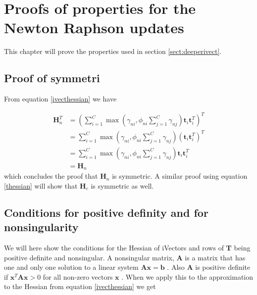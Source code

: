 \chapter{Proofs of properties for the Newton Raphson updates}

This chapter will prove the properties used in section \ref{sect:deeperivect}. 


\section{Proof of symmetri}
\label{symproof}

From equation \ref{ivecthessian} we have

\begin{align*}
\mathbf{H}_n^T &= \left(\sum_{i=1}^{C}\max(\gamma_{ni}, \phi_{ni}\sum_{j=1}^{C}\gamma_{nj})\mathbf{t}_i\mathbf{t}_i^T\right)^T \\
 &= \sum_{i=1}^{C}\max(\gamma_{ni}, \phi_{ni}\sum_{j=1}^{C}\gamma_{nj})\left(\mathbf{t}_i\mathbf{t}_i^T\right)^T \\
 &= \sum_{i=1}^{C}\max(\gamma_{ni}, \phi_{ni}\sum_{j=1}^{C}\gamma_{nj})\mathbf{t}_i\mathbf{t}_i^T \\
 &= \mathbf{H}_n
\end{align*}
which concludes the proof that $\mathbf{H}_n$ is symmetric. A similar proof using equation \ref{thessian} will show that $\mathbf{H}_c$ is symmetric as well.




\section{Conditions for positive definity and for nonsingularity}
\label{posdefproof}
We will here show the conditions for the Hessian of iVectors and rows of $\mathbf{T}$ being positive definite and nonsingular. A nonsingular matrix, $\mathbf{A}$ is a matrix that has one and only one solution to a linear system $\mathbf{Ax}=\mathbf{b}$ \cite[p. 54]{matte3}. Also $\mathbf{A}$ is positive definite if $\mathbf{x}^T\mathbf{Ax} > 0$ for all non-zero vectors $\mathbf{x}$ \cite[p. 246]{matte3}. When we apply this to the approximation to the Hessian from equation \ref{ivecthessian} we get

